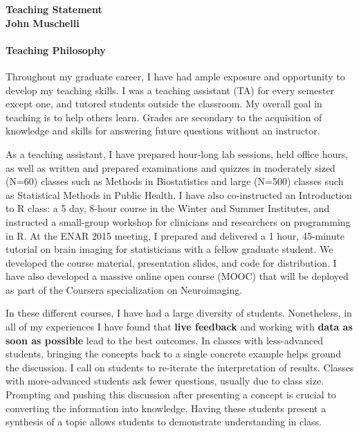 \documentclass[12pt,a4paper]{article}
\author{John Muschelli}
\begin{document}
\thispagestyle{empty}

\begin{center}
{\bf
{\large Teaching Statement }\\
John Muschelli
}
\end{center}
\vspace{-2em}
\paragraph{Teaching Philosophy} Throughout my graduate career, I have had ample exposure and opportunity to develop my teaching skills.  I was a teaching assistant (TA) for every semester except one, and tutored students outside the classroom.  My overall goal in teaching is to help others learn.  Grades are secondary to the acquisition of knowledge and skills for answering future questions without an instructor.  

As a teaching assistant, I have prepared hour-long lab sessions, held office hours, as well as written and prepared examinations and quizzes in moderately sized (N=60) classes such as Methods in Biostatistics and large (N=500) classes such as Statistical Methods in Public Health.   I have also co-instructed an Introduction to R class: a 5 day, 8-hour course in the Winter and Summer Institutes, and instructed a small-group workshop for  clinicians and researchers on programming in R.  At the ENAR 2015 meeting, I prepared and delivered a 1 hour, 45-minute tutorial on brain imaging for statisticians with a fellow graduate student.  We developed the course material, presentation slides, and code for distribution.  I have also developed a massive online open course (MOOC) that will be deployed as part of the Coursera specialization on Neuroimaging. 

In these different courses, I have had a large diversity of students.  Nonetheless, in all of my experiences I have found that {\bf live feedback} and working with {\bf data as soon as possible} lead to the best outcomes.  In classes with less-advanced students, bringing the concepts back to a single concrete example helps ground the discussion.  I call on students to re-iterate the interpretation of results.  Classes with more-advanced students ask fewer questions, usually due to class size. Prompting and pushing this discussion after presenting a concept is crucial to converting the information into knowledge.  Having these students present a synthesis of a topic allows students to demonstrate understanding in class.
\end{document}

